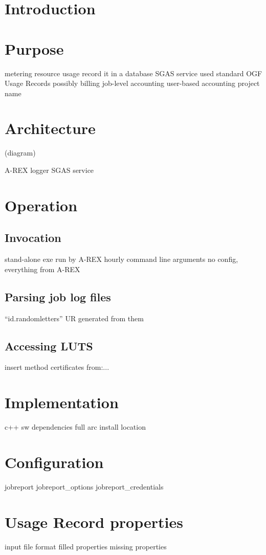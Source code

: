 \documentclass{article}                            %
\begin{document}
\newpage

\section{Introduction}

\section{Purpose}
  metering resource usage
  record it in a database
    SGAS service used
    standard OGF Usage Records
  possibly billing
  job-level accounting
  user-based accounting
  project name

\section{Architecture}
  (diagram)

  A-REX
  logger
  SGAS service

\section{Operation}

  \subsection{Invocation}
    stand-alone exe
    run by A-REX hourly
    command line arguments
    no config, everything from A-REX

  \subsection{Parsing job log files}
    ``id.randomletters''
    UR generated from them

  \subsection{Accessing LUTS}
    insert method
    certificates from:...

\section{Implementation}
  c++
  sw dependencies
    full arc
  install location

\appendix

\section{Configuration}
  jobreport
  jobreport\_options
  jobreport\_credentials

\section{Usage Record properties}
  input file format
  filled properties
  missing properties


\end{document}
